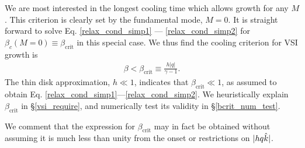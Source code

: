 
We are most interested in the longest cooling time which allows growth for any $M$.  
This criterion is clearly set by the fundamental mode, $M = 0$. It is straight
forward to solve Eq. \ref{relax_cond_simp1} --- \ref{relax_cond_simp2}
for $\beta_c(M=0)  \equiv \beta_\mathrm{crit}$ in this special case. We thus find the cooling criterion for  
VSI growth is  
 \begin{align}\label{iso_vsi_cond}
   \beta <   \beta_\mathrm{crit}  \equiv
   \frac{h|q|}{\gamma-1} . 
 \end{align}
 The thin disk approximation, $h \ll 1$, indicates that $\beta_\mathrm{crit} \ll
 1$, as assumed to obtain Eq. \ref{relax_cond_simp1}---\ref{relax_cond_simp2}. 
 We heuristically explain $\beta_\mathrm{crit}$ in \S\ref{vsi_require}, and numerically
 test its validity in \S\ref{bcrit_num_test}.  
 
We comment that the expression for $\beta_\mathrm{crit}$ may in fact 
be obtained without assuming it is much less than unity from the onset or 
restrictions on $| h q \hat{k}|$.  %
 



